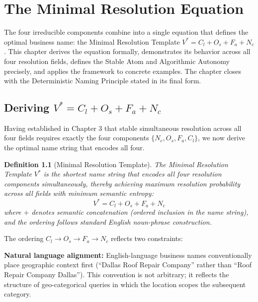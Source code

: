 \documentclass[12pt, openany]{book}
\theoremstyle{thmstyle}
\theoremstyle{defstyle}
\newtheorem{definition}{Definition}[chapter]
\newcommand{\vstar}{V^{*}}
\newcommand{\Nc}{N_c}
\newcommand{\Os}{O_s}
\newcommand{\Fa}{F_a}
\newcommand{\Cl}{C_l}
\begin{document}
\chapter{The Minimal Resolution Equation}

\begin{keybox}
The four irreducible components combine into a single equation that defines the optimal business name: the Minimal Resolution Template $\vstar = \Cl + \Os + \Fa + \Nc$. This chapter derives the equation formally, demonstrates its behavior across all four resolution fields, defines the Stable Atom and Algorithmic Autonomy precisely, and applies the framework to concrete examples. The chapter closes with the Deterministic Naming Principle stated in its final form.
\end{keybox}

\section{Deriving $V^* = C_l + O_s + F_a + N_c$}

Having established in Chapter 3 that stable simultaneous resolution across all four fields requires exactly the four components $\{\Nc, \Os, \Fa, \Cl\}$, we now derive the optimal name string that encodes all four.

\begin{definition}[Minimal Resolution Template]
The Minimal Resolution Template $\vstar$ is the shortest name string that encodes all four resolution components simultaneously, thereby achieving maximum resolution probability across all fields with minimum semantic entropy:
\begin{equation}
\vstar = \Cl + \Os + \Fa + \Nc
\label{eq:vstar}
\end{equation}
where $+$ denotes semantic concatenation (ordered inclusion in the name string), and the ordering follows standard English noun-phrase construction.
\end{definition}

The ordering $\Cl \to \Os \to \Fa \to \Nc$ reflects two constraints:

\textbf{Natural language alignment:} English-language business names conventionally place geographic context first (``Dallas Roof Repair Company'' rather than ``Roof Repair Company Dallas''). This convention is not arbitrary; it reflects the structure of geo-categorical queries in which the location scopes the subsequent category.
\end{document}
